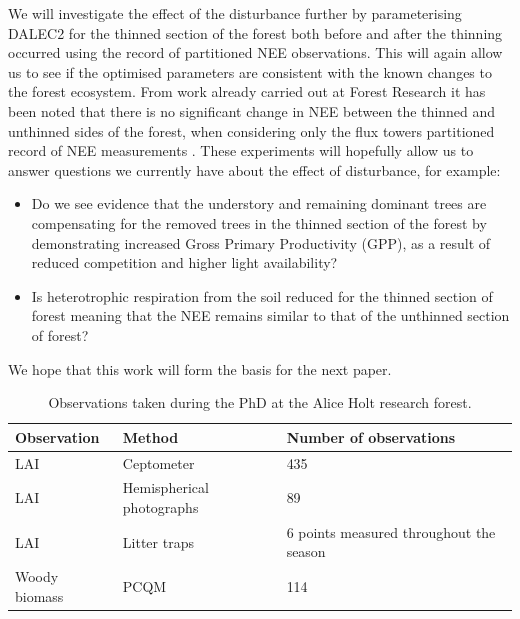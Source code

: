 \documentclass[11pt]{article}
\begin{document}
We will investigate the effect of the disturbance further by parameterising DALEC2 for the thinned section of the forest both before and after the thinning occurred using the record of partitioned NEE observations. This will again allow us to see if the optimised parameters are consistent with the known changes to the forest ecosystem. From work already carried out at Forest Research it has been noted that there is no significant change in NEE between the thinned and unthinned sides of the forest, when considering only the flux towers partitioned record of NEE measurements \citep{wilkinson2016}. These experiments will hopefully allow us to answer questions we currently have about the effect of disturbance, for example:
\begin{itemize}
\item Do we see evidence that the understory and remaining dominant trees are compensating for the removed trees in the thinned section of the forest by demonstrating increased Gross Primary Productivity (GPP), as a result of reduced competition and higher light availability?
\item Is heterotrophic respiration from the soil reduced for the thinned section of forest meaning that the NEE remains similar to that of the unthinned section of forest?
\end{itemize}  
We hope that this work will form the basis for the next paper.
\begin{table}[ht] 
\begin{center}
	\begin{tabularx}{\textwidth}{| l | X | X |}
	\hline
	Observation & Method & Number of observations \\ \hline
	LAI & Ceptometer \citep{fassnacht1994comparison} & 435 \\ \hline
	LAI & Hemispherical photographs \citep{Jonckheere2004} & 89  \\ \hline
	LAI & Litter traps \citep{kimmins1973some} & 6 points measured throughout the season \\ \hline
	Woody biomass & PCQM \citep{dahdouh2006empirical} & 114  \\ 
	\hline
	\end{tabularx}
	\caption{Observations taken during the PhD at the Alice Holt research forest.}
	\label{table:obs}
\end{center} 
\end{table}
\end{document}
